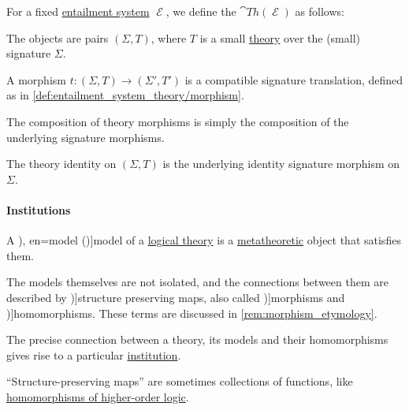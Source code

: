 \begin{definition}\label{def:category_of_theories}
  For a fixed \hyperref[def:entailment_system]{entailment system} \( \mscrE \), we define the  \( \cat{Th}(\mscrE) \) as follows:
  \begin{thmenum}
     The objects are pairs \( (\Sigma, T) \), where \( T \) is a small \hyperref[def:entailment_system_theory]{theory} over the (small) signature \( \Sigma \).

     A morphism \( t: (\Sigma, T) \to (\Sigma', T') \) is a compatible signature translation, defined as in \cref{def:entailment_system_theory/morphism}.

     The composition of theory morphisms is simply the composition of the underlying signature morphisms.

     The theory identity on \( (\Sigma, T) \) is the underlying identity signature morphism on \( \Sigma \).
  \end{thmenum}
\end{definition}

\paragraph{Institutions}

\begin{concept}\label{con:logical_model}
  A \term[ru=модель (\cite[71]{КолмогоровДрагалин2006ЛогикаВведение}), en=model (\cite[25]{Kleene1971Metamathematics})]{model} of a \hyperref[def:logical_theory]{logical theory} is a \hyperref[con:metalogic]{metatheoretic} object that satisfies them.

  The models themselves are not isolated, and the connections between them are described by \term[en=structure-preserving map (\cite[25]{DaveyPriestley2002LatticeTheory})]{structure preserving maps}, also called \term[en=morphism (\cite[25]{DaveyPriestley2002LatticeTheory})]{morphisms} and \term[en=homomorphism (\cite[108]{Schwartzman1996WordsOfMathematics})]{homomorphisms}. These terms are discussed in \cref{rem:morphism_etymology}.

  The precise connection between a theory, its models and their homomorphisms gives rise to a particular \hyperref[def:institution]{institution}.
\end{concept}
\begin{comments}
  \item \enquote{Structure-preserving maps} are sometimes collections of functions, like \hyperref[def:hol_homomorphism]{homomorphisms of higher-order logic}.
\end{comments}

